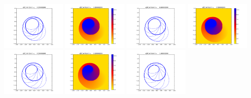 \documentclass[11pt]{article}
\begin{document}
\includegraphics[width=0.2375\textwidth]{frame0007fig1.png}
\vskip 10pt 
\includegraphics[width=0.2375\textwidth]{frame0008fig0.png}
\includegraphics[width=0.2375\textwidth]{frame0008fig1.png}
\includegraphics[width=0.2375\textwidth]{frame0009fig0.png}
\includegraphics[width=0.2375\textwidth]{frame0009fig1.png}
\vskip 10pt 
\includegraphics[width=0.2375\textwidth]{frame0010fig0.png}
\includegraphics[width=0.2375\textwidth]{frame0010fig1.png}
\end{document}
